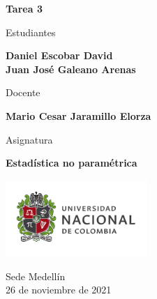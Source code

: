 \begin{titlepage}
   \Large{
   \begin{center}
       \vspace*{1cm}

       \textbf{Tarea 3}

            
       \vspace{1.5cm}
       
       Estudiantes
       
       \vspace{0.5cm}
        
        
       \textbf{Daniel Escobar David} \\

	\textbf{Juan José Galeano Arenas}

              \vspace{1cm}
       
       Docente
       
       \vspace{0.5cm}

       \textbf{Mario Cesar Jaramillo Elorza}
       
       \vspace{0.4cm}

       \vspace{1.4cm}
       
       Asignatura
       
       \vspace{0.5cm}

       \textbf{Estadística no paramétrica}

       \vfill

            
       \vspace{0.4cm}
     
       \includegraphics[width=0.4\textwidth]{logounal.png}
            
       Sede Medellín\\
       26 de noviembre de 2021
       
   \end{center}
   }
\end{titlepage}